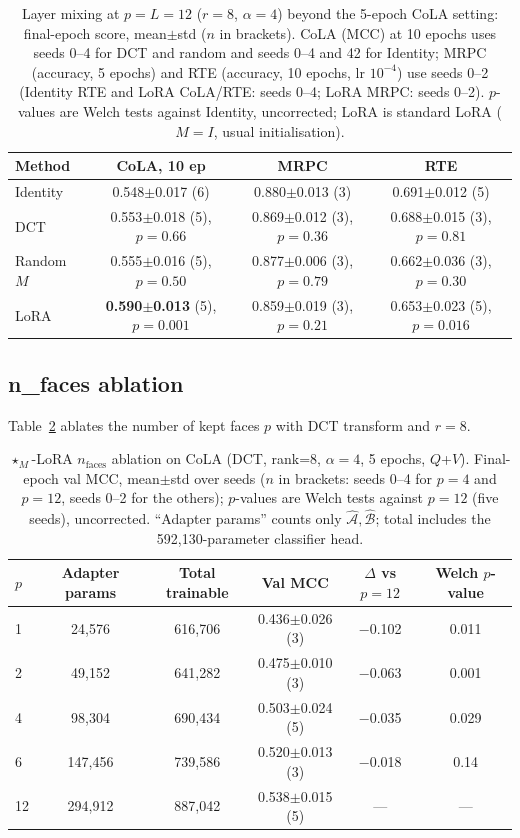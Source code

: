 \documentclass{article}
\newcommand{\cA}{\mathcal{A}}
\newcommand{\cB}{\mathcal{B}}
\theoremstyle{plain}
\begin{document}
\begin{table}[h]
\centering
\caption{Layer mixing at $p=L=12$ ($r=8$, $\alpha=4$) beyond the 5-epoch CoLA setting: final-epoch score, mean$\pm$std ($n$ in brackets).
CoLA (MCC) at 10 epochs uses seeds 0--4 for DCT and random and seeds 0--4 and 42 for Identity; MRPC (accuracy, 5 epochs) and RTE (accuracy, 10 epochs, lr $10^{-4}$) use seeds 0--2
(Identity RTE and LoRA CoLA/RTE: seeds 0--4; LoRA MRPC: seeds 0--2).
$p$-values are Welch tests against Identity, uncorrected; LoRA is standard LoRA ($M=I$, usual initialisation).}
\label{tab:mixing}
\small
\begin{tabular}{lccc}
\toprule
Method & CoLA, 10 ep & MRPC & RTE \\
\midrule
Identity   & 0.548$\pm$0.017 (6) & 0.880$\pm$0.013 (3) & 0.691$\pm$0.012 (5) \\
DCT        & 0.553$\pm$0.018 (5), $p=0.66$ & 0.869$\pm$0.012 (3), $p=0.36$ & 0.688$\pm$0.015 (3), $p=0.81$ \\
Random $M$ & 0.555$\pm$0.016 (5), $p=0.50$ & 0.877$\pm$0.006 (3), $p=0.79$ & 0.662$\pm$0.036 (3), $p=0.30$ \\
\midrule
LoRA       & \textbf{0.590$\pm$0.013} (5), $p=0.001$ & 0.859$\pm$0.019 (3), $p=0.21$ & 0.653$\pm$0.023 (5), $p=0.016$ \\
\bottomrule
\end{tabular}
\end{table}

\subsection{n\_faces ablation}
\label{sec:faces_ablation}

Table~\ref{tab:nfaces} ablates the number of kept faces $p$ with DCT transform
and $r=8$.

\begin{table}[h]
\centering
\caption{$\star_M$-LoRA $n_{\text{faces}}$ ablation on CoLA (DCT, rank=8, $\alpha=4$, 5 epochs, $Q$+$V$).
Final-epoch val MCC, mean$\pm$std over seeds ($n$ in brackets: seeds 0--4 for $p=4$ and $p=12$, seeds 0--2 for the others);
$p$-values are Welch tests against $p=12$ (five seeds), uncorrected.
``Adapter params'' counts only $\hat{\cA}, \hat{\cB}$; total includes the 592,130-parameter classifier head.}
\label{tab:nfaces}
\begin{tabular}{lccccc}
\toprule
$p$ & Adapter params & Total trainable & Val MCC & $\Delta$ vs $p{=}12$ & Welch $p$-value \\
\midrule
1  &  24,576 & 616,706 & 0.436$\pm$0.026 (3) & $-$0.102 & 0.011 \\
2  &  49,152 & 641,282 & 0.475$\pm$0.010 (3) & $-$0.063 & 0.001 \\
4  &  98,304 & 690,434 & 0.503$\pm$0.024 (5) & $-$0.035 & 0.029 \\
6  & 147,456 & 739,586 & 0.520$\pm$0.013 (3) & $-$0.018 & 0.14 \\
12 & 294,912 & 887,042 & 0.538$\pm$0.015 (5) & --- & --- \\
\bottomrule
\end{tabular}
\end{table}
\end{document}
